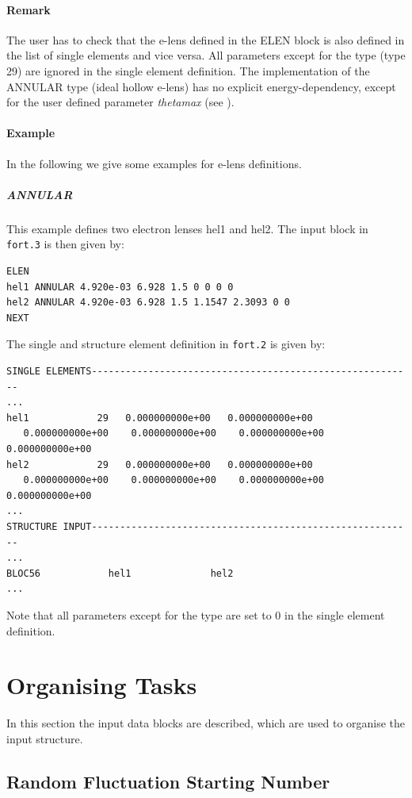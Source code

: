 \documentclass[a4paper,11pt]{report}
\begin{document}
\paragraph{Remark} The user has to check that the e-lens defined in the ELEN block is also defined in the list of single elements and vice versa. All parameters except for the type (type 29) are ignored in the single element definition.
The implementation of the ANNULAR type (ideal hollow e-lens) has no explicit energy-dependency, except for the user defined parameter \emph{thetamax} (see \cite{sixphys}).

\paragraph{Example} In the following we give some examples for e-lens definitions.

\subparagraph{ANNULAR} This example defines two electron lenses hel1 and hel2. The input block in \verb|fort.3| is then given by:
\begin{verbatim}
ELEN
hel1 ANNULAR 4.920e-03 6.928 1.5 0 0 0 0
hel2 ANNULAR 4.920e-03 6.928 1.5 1.1547 2.3093 0 0
NEXT
\end{verbatim}
The single and structure element definition in \verb|fort.2| is given by:
\begin{verbatim}
SINGLE ELEMENTS---------------------------------------------------------
...
hel1            29   0.000000000e+00   0.000000000e+00 
   0.000000000e+00    0.000000000e+00    0.000000000e+00    0.000000000e+00
hel2            29   0.000000000e+00   0.000000000e+00   
   0.000000000e+00    0.000000000e+00    0.000000000e+00    0.000000000e+00
...
STRUCTURE INPUT---------------------------------------------------------
...
BLOC56            hel1              hel2
...
\end{verbatim}
Note that all parameters except for the type are set to 0 in the single element definition.


\section{Organising Tasks}

In this section the input data blocks are described, which are used to
organise the input structure.

\subsection{Random Fluctuation Starting Number} \label{FluNum}
\end{document}
